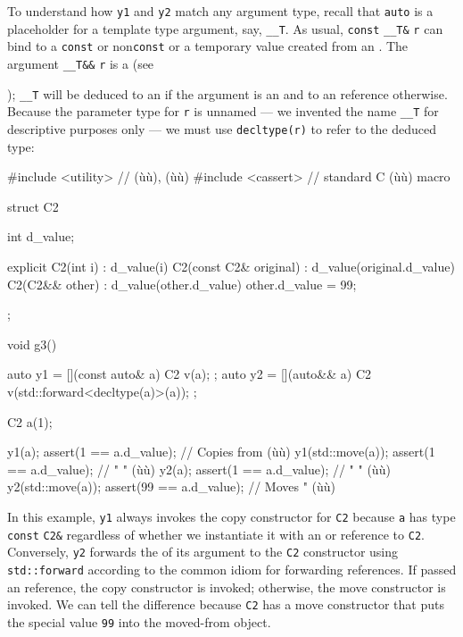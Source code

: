 \noindent To understand how \lstinline!y1! and \lstinline!y2! match any argument type,
recall that \lstinline!auto! is a placeholder for a template type argument,
say, \lstinline!__T!. As usual, \lstinline!const! \lstinline!__T&!
\lstinline!r! can bind to a \lstinline!const! or non\lstinline!const!
 or a temporary value created from an . The
argument \lstinline!__T&&! \lstinline!r! is a  (see {); \lstinline!__T! will be
deduced to an  if the argument is an  and to
an  reference otherwise. Because the parameter type for
\lstinline!r! is unnamed --- we invented the name \lstinline!__T! for
descriptive purposes only --- we must use \lstinline!decltype(r)! to refer
to the deduced type:

\begin{emcppslisting}[emcppsstandards={c++14}]
#include <utility>  // (ù{}ù), (ù{}ù)
#include <cassert>  // standard C (ù{}ù) macro

struct C2
{
    int d_value;

    explicit C2(int i)     : d_value(i)                { }
    C2(const C2& original) : d_value(original.d_value) { }
    C2(C2&& other)         : d_value(other.d_value)    { other.d_value = 99; }
};

void g3()
{
    auto y1 = [](const auto& a) { C2 v(a); };
    auto y2 = [](auto&&      a) { C2 v(std::forward<decltype(a)>(a)); };

    C2 a(1);

    y1(a);            assert(1  == a.d_value);  // Copies from (ù{}ù)
    y1(std::move(a)); assert(1  == a.d_value);  //    "     "  (ù{}ù)
    y2(a);            assert(1  == a.d_value);  //    "     "  (ù{}ù)
    y2(std::move(a)); assert(99 == a.d_value);  // Moves    "  (ù{}ù)
}
\end{emcppslisting}
    

\noindent In this example, \lstinline!y1! always invokes the copy constructor for
\lstinline!C2! because \lstinline!a! has type \lstinline!const! \lstinline!C2&!
regardless of whether we instantiate it with an  or
 reference to \lstinline!C2!. Conversely, \lstinline!y2! forwards
the  of its argument to the \lstinline!C2!
constructor using \lstinline!std::forward! according to the common idiom
for forwarding references. If passed an  reference, the
copy constructor is invoked; otherwise, the move constructor is invoked.
We can tell the difference because \lstinline!C2! has a move constructor
that puts the special value \lstinline!99! into the moved-from object.

}
